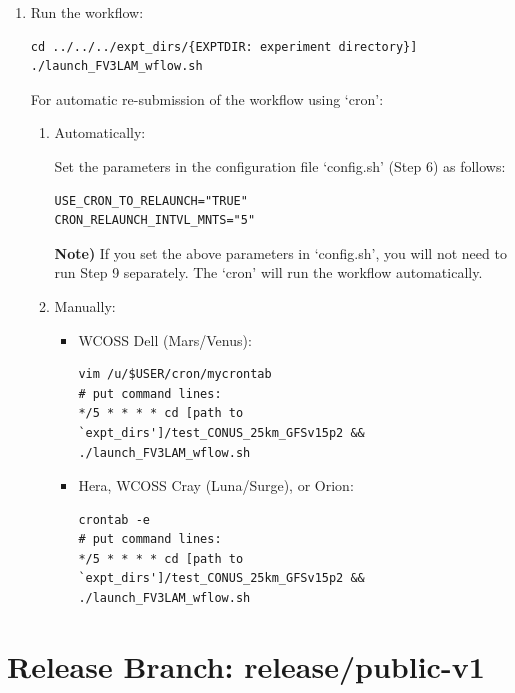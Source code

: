 \documentclass[11pt,fleqn]{report}              %
\begin{document}
\begin{enumerate}
\item Run the workflow: 
\lstset{language=bash}   
\begin{lstlisting}[frame=trBL]
cd ../../../expt_dirs/{EXPTDIR: experiment directory}]
./launch_FV3LAM_wflow.sh
\end{lstlisting}

For automatic re-submission of the workflow using `cron':
\begin{enumerate}
\item Automatically:

Set the parameters in the configuration file `config.sh' (Step 6) as follows:
\lstset{language=bash}   
\begin{lstlisting}[frame=trBL]
USE_CRON_TO_RELAUNCH="TRUE"
CRON_RELAUNCH_INTVL_MNTS="5"
\end{lstlisting}

{\bf Note)} If you set the above parameters in `config.sh', you will not need to run Step 9 separately. The `cron' will run the workflow automatically.

\item Manually:
\begin{itemize}
\item WCOSS Dell (Mars/Venus):
\lstset{language=bash}   
\begin{lstlisting}[frame=trBL]
vim /u/$USER/cron/mycrontab
# put command lines:
*/5 * * * * cd [path to `expt_dirs']/test_CONUS_25km_GFSv15p2 && ./launch_FV3LAM_wflow.sh
\end{lstlisting}

\item Hera, WCOSS Cray (Luna/Surge), or Orion:
\lstset{language=bash}   
\begin{lstlisting}[frame=trBL]
crontab -e
# put command lines:
*/5 * * * * cd [path to `expt_dirs']/test_CONUS_25km_GFSv15p2 && ./launch_FV3LAM_wflow.sh
\end{lstlisting}

\end{itemize}
\end{enumerate}

\end{enumerate}


 \clearpage



\section{Release Branch: release/public-v1}
\label{sec:quick_release_v1}
\end{document}
